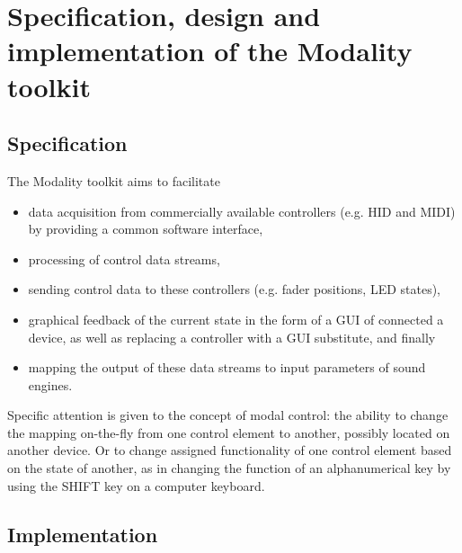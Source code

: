 \documentclass{article}
\begin{document}
\section{Specification, design and implementation of the Modality toolkit}
\label{sec:implementation}

\subsection{Specification}
\label{sub:specification}

The Modality toolkit aims to facilitate
\begin{itemize}
	\item data acquisition from commercially available controllers (e.g. HID and MIDI) by providing a common software interface,
	\item processing of control data streams,
	\item sending control data to these controllers (e.g. fader positions, LED states),
	\item graphical feedback  of the current state in the form of a GUI of connected a device, as well as replacing a controller with a GUI substitute, and finally
	\item mapping the output of these data streams to input parameters of sound engines.
\end{itemize}

Specific attention is given to the concept of modal control: the ability to change the mapping on-the-fly from one control element to another, possibly located on another device.
Or to change assigned functionality of one control element based on the state of another, as in changing the function of an alphanumerical key by using the SHIFT key on a computer keyboard.

\subsection{Implementation}
\label{sub:implementation}
\end{document}
